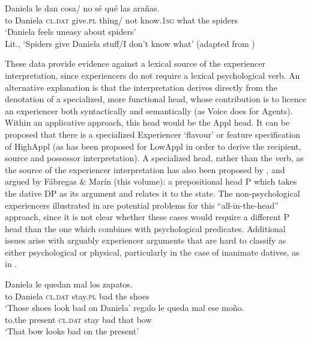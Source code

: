 \documentclass[output=paper,colorlinks,citecolor=brown,nonflat]{./langscibook}
\begin{document}
\ea%
    \label{ex:cuervo:18}
     {Daniela} {le} {dan} {cosa/} {no} {sé} {qué} {las} {arañas}.\\
    {to} Daniela    \textsc{cl.dat} give.\textsc{pl} thing/ not know.1\textsc{sg} what the spiders\\
    \glt ‘Daniela feels uneasy about spiders’\\
    Lit., ‘Spiders give Daniela stuff/I don’t know what’ (adapted from   \citealt{DiTullio2015})
    \z

These data provide evidence against a lexical source of the experiencer interpretation, since experiencers do not require a lexical psychological verb. An alternative explanation is that the interpretation derives directly from the denotation of a specialized, more functional head, whose contribution is to licence an experiencer both syntactically and semantically (as Voice does for Agents). Within an applicative approach, this head would be the Appl head. It can be proposed that there is a specialized Experiencer ‘flavour’ or feature specification of HighAppl (as has been proposed for LowAppl in order to derive the recipient, source and possessor interpretation). A specialized head, rather than the verb, as the source of the experiencer interpretation has also been proposed by \citet{Landau2010}, and argued by Fábregas \& Marín (this volume): a prepositional head P which takes the dative DP as its argument and relates it to the state. The non-psychological experiencers illustrated in  are potential problems for this “all-in-the-head” approach, since it is not clear whether these cases would require a different P head than the one which combines with psychological predicates. Additional issues arise with arguably experiencer arguments that are hard to classify as either psychological or physical, particularly in the case of inanimate datives, as in . 

\ea%
    \label{ex:cuervo:19}
    \ea%
        \label{ex:cuervo:19a}
         {Daniela} {le} {quedan} {mal}  {los} {zapatos}.\\
        {to} Daniela  \textsc{cl.dat} stay.\textsc{pl} bad  the shoes\\
        \glt ‘Those shoes look bad on Daniela’
    \ex%
        \label{ex:cuervo:19b}
         {regalo}     {le} {queda} {mal}  {ese} {moño}.\\
        to.the present \textsc{cl.dat} stay bad  that bow\\
        \glt ‘That bow looks bad on the present’
    \z
\z
\end{document}
